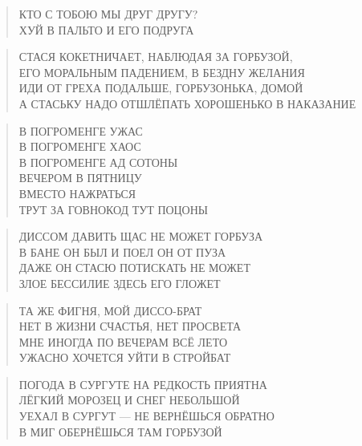 \poemtitle{***}
\begin{verse}
КТО С ТОБОЮ МЫ ДРУГ ДРУГУ?\\
ХУЙ В ПАЛЬТО И ЕГО ПОДРУГА
\end{verse}

\poemtitle{***}
\begin{verse}
СТАСЯ КОКЕТНИЧАЕТ, НАБЛЮДАЯ ЗА ГОРБУЗОЙ,\\
ЕГО МОРАЛЬНЫМ ПАДЕНИЕМ, В БЕЗДНУ ЖЕЛАНИЯ\\
ИДИ ОТ ГРЕХА ПОДАЛЬШЕ, ГОРБУЗОНЬКА, ДОМОЙ\\
А СТАСЬКУ НАДО ОТШЛЁПАТЬ ХОРОШЕНЬКО В НАКАЗАНИЕ
\end{verse}

\poemtitle{***}
\begin{verse}
В ПОГРОМЕНГЕ УЖАС\\
В ПОГРОМЕНГЕ ХАОС\\
В ПОГРОМЕНГЕ АД СОТОНЫ\\
ВЕЧЕРОМ В ПЯТНИЦУ\\
ВМЕСТО НАЖРАТЬСЯ\\
ТРУТ ЗА ГОВНОКОД ТУТ ПОЦОНЫ
\end{verse}

\poemtitle{***}
\begin{verse}
ДИССОМ ДАВИТЬ ЩАС НЕ МОЖЕТ ГОРБУЗА\\
В БАНЕ ОН БЫЛ И ПОЕЛ ОН ОТ ПУЗА\\
ДАЖЕ ОН СТАСЮ ПОТИСКАТЬ НЕ МОЖЕТ\\
ЗЛОЕ БЕССИЛИЕ ЗДЕСЬ ЕГО ГЛОЖЕТ
\end{verse}

\poemtitle{***}
\begin{verse}
ТА ЖЕ ФИГНЯ, МОЙ ДИССО-БРАТ\\
НЕТ В ЖИЗНИ СЧАСТЬЯ, НЕТ ПРОСВЕТА\\
МНЕ ИНОГДА ПО ВЕЧЕРАМ ВСЁ ЛЕТО\\
УЖАСНО ХОЧЕТСЯ УЙТИ В СТРОЙБАТ
\end{verse}

\poemtitle{***}
\begin{verse}
ПОГОДА В СУРГУТЕ НА РЕДКОСТЬ ПРИЯТНА\\
ЛЁГКИЙ МОРОЗЕЦ И СНЕГ НЕБОЛЬШОЙ\\
УЕХАЛ В СУРГУТ — НЕ ВЕРНЁШЬСЯ ОБРАТНО\\
В МИГ ОБЕРНЁШЬСЯ ТАМ ГОРБУЗОЙ
\end{verse}

